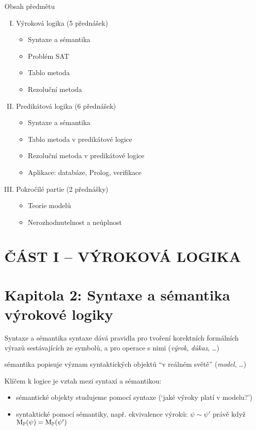\documentclass{beamer}
\begin{document}
\begin{frame}{Obsah předmětu}

    \begin{enumerate}[I.]
        \item Výroková logika (5 přednášek)
        \begin{itemize}
            \item Syntaxe a sémantika
            \item Problém SAT
            \item Tablo metoda
            \item Rezoluční metoda
        \end{itemize}
        \item Predikátová logika (6 přednášek)
        \begin{itemize}
            \item Syntaxe a sémantika
            \item Tablo metoda v predikátové logice
            \item Rezoluční metoda v predikátové logice
            \item Aplikace: databáze, Prolog, verifikace
        \end{itemize}
        \item Pokročilé partie (2 přednášky)
        \begin{itemize}
            \item Teorie modelů
            \item Nerozhodnutelnost a neúplnost
        \end{itemize}
    \end{enumerate}    

\end{frame}


\section*{ČÁST I -- VÝROKOVÁ LOGIKA}


\section{\sc Kapitola 2: Syntaxe a sémantika výrokové logiky}


\begin{frame}{Syntaxe a sémantika}
    \alert{syntaxe} dává pravidla pro tvoření korektních formálních výrazů sestávajících ze symbolů, a pro operace s nimi (\emph{výrok}, \emph{důkaz}, \dots)
    
    \alert{sémantika} popisuje význam syntaktických objektů ``v reálném světě'' (\emph{model}, \dots)
        
    Klíčem k logice je \alert{vztah mezi syntaxí a sémantikou}:
    \begin{itemize}
        \item sémantické objekty studujeme pomocí syntaxe (`jaké výroky platí v modelu?')
        \item syntaktické pomocí sémantiky, např. ekvivalence výroků: $\psi \sim \psi'$ právě když $\operatorname{M}_\mathbb P(\psi)=\operatorname{M}_\mathbb P(\psi')$
    \end{itemize}
\end{frame}
\end{document}
